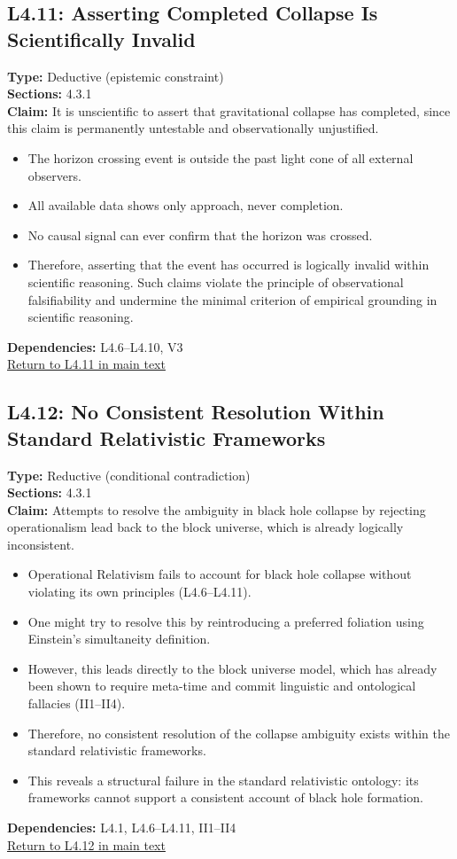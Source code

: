 \documentclass[12pt]{book}
\newcommand{\returnlink}[1]{\hyperref[logic:#1]{Return to #1 in main text}\xspace}
\begin{document}
\subsection*{L4.11: Asserting Completed Collapse Is Scientifically Invalid}\label{appendix:L4.11}
\textbf{Type:} Deductive (epistemic constraint) \\
\textbf{Sections:} 4.3.1 \\
\textbf{Claim:} It is unscientific to assert that gravitational collapse has completed, since this claim is permanently untestable and observationally unjustified.
\begin{itemize}
  \item The horizon crossing event is outside the past light cone of all external observers.
  \item All available data shows only approach, never completion.
  \item No causal signal can ever confirm that the horizon was crossed.
  \item Therefore, asserting that the event has occurred is logically invalid within scientific reasoning. Such claims violate the principle of observational falsifiability and undermine the minimal criterion of empirical grounding in scientific reasoning.
\end{itemize}
\textbf{Dependencies:} L4.6–L4.10, V3 \\
\returnlink{L4.11}

\subsection*{L4.12: No Consistent Resolution Within Standard Relativistic Frameworks}
\label{appendix:L4.12}
\textbf{Type:} Reductive (conditional contradiction) \\
\textbf{Sections:} 4.3.1 \\
\textbf{Claim:} Attempts to resolve the ambiguity in black hole collapse by rejecting operationalism lead back to the block universe, which is already logically inconsistent.
\begin{itemize}
  \item Operational Relativism fails to account for black hole collapse without violating its own principles (L4.6–L4.11).
  \item One might try to resolve this by reintroducing a preferred foliation using Einstein's simultaneity definition.
  \item However, this leads directly to the block universe model, which has already been shown to require meta-time and commit linguistic and ontological fallacies (II1–II4).
  \item Therefore, no consistent resolution of the collapse ambiguity exists within the standard relativistic frameworks.
  \item This reveals a structural failure in the standard relativistic ontology: its frameworks cannot support a consistent account of black hole formation.
\end{itemize}
\textbf{Dependencies:} L4.1, L4.6–L4.11, II1–II4 \\
\returnlink{L4.12}
\end{document}
